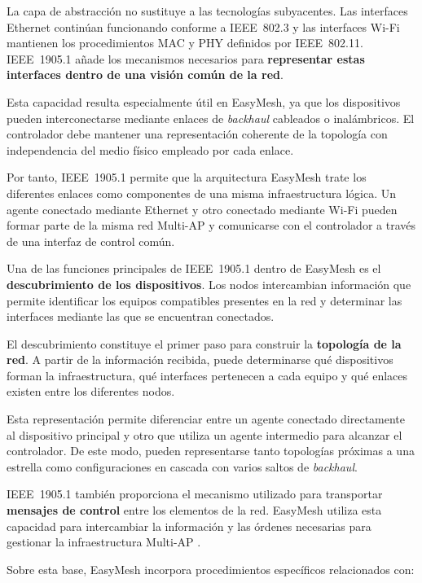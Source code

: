 La capa de abstracción no sustituye a las tecnologías subyacentes. Las
interfaces Ethernet continúan funcionando conforme a IEEE~802.3 y las
interfaces Wi-Fi mantienen los procedimientos MAC y PHY definidos por
IEEE~802.11. IEEE~1905.1 añade los mecanismos necesarios para
\textbf{representar estas interfaces dentro de una visión común de la
red}.

Esta capacidad resulta especialmente útil en EasyMesh, ya que los
dispositivos pueden interconectarse mediante enlaces de
\textit{backhaul} cableados o inalámbricos. El controlador debe mantener
una representación coherente de la topología con independencia del medio
físico empleado por cada enlace.

Por tanto, IEEE~1905.1 permite que la arquitectura EasyMesh trate los
diferentes enlaces como componentes de una misma infraestructura lógica.
Un agente conectado mediante Ethernet y otro conectado mediante Wi-Fi
pueden formar parte de la misma red Multi-AP y comunicarse con el
controlador a través de una interfaz de control común.

Una de las funciones principales de IEEE~1905.1 dentro de EasyMesh es el
\textbf{descubrimiento de los dispositivos}. Los nodos intercambian
información que permite identificar los equipos compatibles presentes en
la red y determinar las interfaces mediante las que se encuentran
conectados.

El descubrimiento constituye el primer paso para construir la
\textbf{topología de la red}. A partir de la información recibida, puede
determinarse qué dispositivos forman la infraestructura, qué interfaces
pertenecen a cada equipo y qué enlaces existen entre los diferentes
nodos.

Esta representación permite diferenciar entre un agente conectado
directamente al dispositivo principal y otro que utiliza un agente
intermedio para alcanzar el controlador. De este modo, pueden
representarse tanto topologías próximas a una estrella como
configuraciones en cascada con varios saltos de
\textit{backhaul}.

IEEE~1905.1 también proporciona el mecanismo utilizado para transportar
\textbf{mensajes de control} entre los elementos de la red. EasyMesh
utiliza esta capacidad para intercambiar la información y las órdenes
necesarias para gestionar la infraestructura Multi-AP
\cite{wifi_alliance_easymesh,ieee_1905_1}.

Sobre esta base, EasyMesh incorpora procedimientos específicos
relacionados con:

